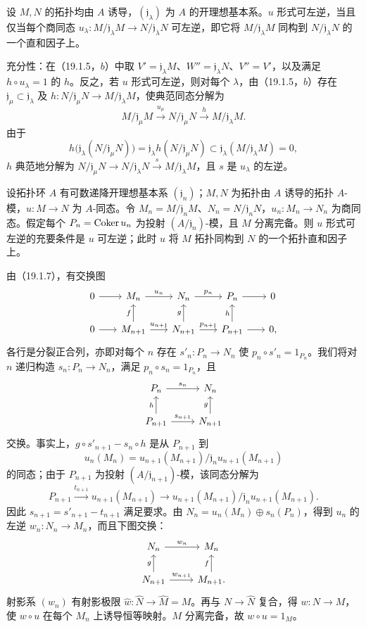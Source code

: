 设 $M,N$ 的拓扑均由 $A$ 诱导，$(\mathfrak j_\lambda)$ 为 $A$ 的开理想基本系。$u$ 形式可左逆，当且仅当每个商同态
$u_\lambda:M/\mathfrak j_\lambda M\to N/\mathfrak j_\lambda N$ 可左逆，即它将 $M/\mathfrak j_\lambda M$ 同构到 $N/\mathfrak j_\lambda N$ 的一个直和因子上。

充分性：在（19.1.5，$b$）中取 $V'=\mathfrak j_\lambda M$、$W''=\mathfrak j_\lambda N$、$V''=V'$，以及满足 $h\circ u_\lambda=1$ 的 $h$。反之，若 $u$ 形式可左逆，则对每个 $\lambda$，由（19.1.5，$b$）存在 $\mathfrak j_\mu\subset\mathfrak j_\lambda$ 及 $h:N/\mathfrak j_\mu N\to M/\mathfrak j_\lambda M$，使典范同态分解为
\[
 M/\mathfrak j_\mu M\xrightarrow{u_\mu}N/\mathfrak j_\mu N\xrightarrow{h}M/\mathfrak j_\lambda M.
\]
由于
\[
 h\bigl(\mathfrak j_\lambda(N/\mathfrak j_\mu N)\bigr)
 =\mathfrak j_\lambda h(N/\mathfrak j_\mu N)
 \subset\mathfrak j_\lambda(M/\mathfrak j_\lambda M)=0,
\]
$h$ 典范地分解为 $N/\mathfrak j_\mu N\to N/\mathfrak j_\lambda N\xrightarrow{s}M/\mathfrak j_\lambda M$，且 $s$ 是 $u_\lambda$ 的左逆。

设拓扑环 $A$ 有可数递降开理想基本系 $(\mathfrak j_n)$；$M,N$ 为拓扑由 $A$ 诱导的拓扑 $A$-模，$u:M\to N$ 为 $A$-同态。令 $M_n=M/\mathfrak j_nM$、$N_n=N/\mathfrak j_nN$，$u_n:M_n\to N_n$ 为商同态。假定每个 $P_n=\operatorname{Coker} u_n$ 为投射 $(A/\mathfrak j_n)$-模，且 $M$ 分离完备。则 $u$ 形式可左逆的充要条件是 $u$ 可左逆；此时 $u$ 将 $M$ 拓扑同构到 $N$ 的一个拓扑直和因子上。

由（19.1.7），有交换图
\[
\begin{tikzcd}[column sep=1.8em]
 0\arrow[r]&M_n\arrow[r,"u_n"]&N_n\arrow[r,"p_n"]&P_n\arrow[r]&0\\
 0\arrow[r]&M_{n+1}\arrow[u,"f"]\arrow[r,"u_{n+1}"]&N_{n+1}\arrow[u,"g"]\arrow[r,"p_{n+1}"]&P_{n+1}\arrow[u,"h"]\arrow[r]&0,
\end{tikzcd}
\]
各行是分裂正合列，亦即对每个 $n$ 存在 $s'_n:P_n\to N_n$ 使 $p_n\circ s'_n=1_{P_n}$。我们将对 $n$ 递归构造 $s_n:P_n\to N_n$，满足 $p_n\circ s_n=1_{P_n}$，且
\[
\begin{tikzcd}
 P_n\arrow[r,"s_n"]&N_n\\
 P_{n+1}\arrow[u,"h"]\arrow[r,"s_{n+1}"]&N_{n+1}\arrow[u,"g"]
\end{tikzcd}
\]
交换。事实上，$g\circ s'_{n+1}-s_n\circ h$ 是从 $P_{n+1}$ 到
\[
 u_n(M_n)=u_{n+1}(M_{n+1})/\mathfrak j_nu_{n+1}(M_{n+1})
\]
的同态；由于 $P_{n+1}$ 为投射 $(A/\mathfrak j_{n+1})$-模，该同态分解为
\[
 P_{n+1}\xrightarrow{t_{n+1}}u_{n+1}(M_{n+1})
 \longrightarrow u_{n+1}(M_{n+1})/\mathfrak j_nu_{n+1}(M_{n+1}).
\]
因此 $s_{n+1}=s'_{n+1}-t_{n+1}$ 满足要求。由 $N_n=u_n(M_n)\oplus s_n(P_n)$，得到 $u_n$ 的左逆 $w_n:N_n\to M_n$，而且下图交换：
\[
\begin{tikzcd}
 N_n\arrow[r,"w_n"]&M_n\\
 N_{n+1}\arrow[u,"g"]\arrow[r,"w_{n+1}"]&M_{n+1}\arrow[u,"f"].
\end{tikzcd}
\]
射影系 $(w_n)$ 有射影极限 $\widehat w:\widehat N\to\widehat M=M$。再与 $N\to\widehat N$ 复合，得 $w:N\to M$，使 $w\circ u$ 在每个 $M_n$ 上诱导恒等映射。$M$ 分离完备，故 $w\circ u=1_M$。

